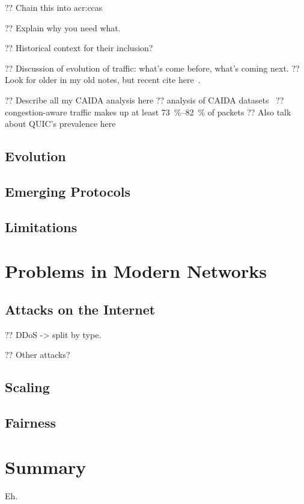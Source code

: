 ?? Chain this into \glspl{acr:cca}

?? Explain why you need what.

?? Historical context for their inclusion?

?? Discussion of evolution of traffic: what's come before, what's coming next.
?? Look for older in my old notes, but recent cite here~\parencite{DBLP:conf/anrw/BauerJHBC21}.

?? Describe all my CAIDA analysis here
?? analysis of CAIDA datasets~\parencite{caida-2018-passive}
?? congestion-aware traffic makes up at least \qtyrange{73}{82}{\percent} of packets
?? Also talk about QUIC's prevalence here

\subsection{Evolution}

\subsection{Emerging Protocols}

\subsection{Limitations}

\section{Problems in Modern Networks}\label{sec:problems-in-modern-networks}

\subsection{Attacks on the Internet}

?? DDoS -> split by type.

?? Other attacks?

\subsection{Scaling}

\subsection{Fairness}

\section{Summary}
Eh.
